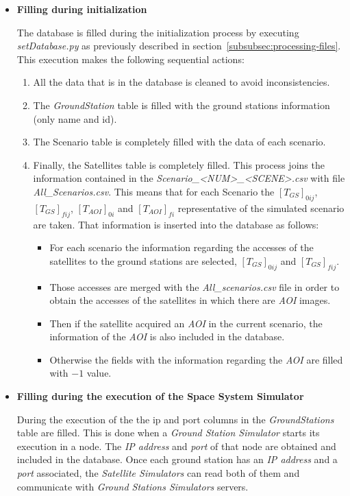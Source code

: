 \begin{itemize}

\item \textbf{Filling during initialization}

The database is filled during the initialization process by executing
\emph{setDatabase.py} as previously described in section~\ref{subsubsec:processing-files}. This execution makes the following sequential
actions:
\begin{enumerate}
\item All the data that is in the database is cleaned to avoid inconsistencies.
\item The \emph{GroundStation} table is filled with the ground stations information (only name and id).
\item The Scenario table is completely filled with the data of each scenario.
\item Finally, the Satellites table is completely filled. This process joins the
  information contained in the \emph{Scenario\_<NUM>\_<SCENE>.csv} with file
  \emph{All\_Scenarios.csv}. This means that for each Scenario the $[T_{GS}]_{0ij}$,
  $[T_{GS}]_{fij}$,  $[T_{AOI}]_{0i}$ and $[T_{AOI}]_{fi}$ representative of the simulated
  scenario are taken. That information is inserted into the database as follows:
\begin{itemize}
\item For each scenario the information regarding the accesses of the satellites to the ground stations are selected, $[T_{GS}]_{0ij}$ and $[T_{GS}]_{fij}$.
\item Those accesses are merged with the \emph{All\_scenarios.csv} file in order to obtain the accesses of the satellites in which there are \emph{AOI} images.
\item Then if the satellite acquired an \emph{AOI} in the current scenario, the information of the \emph{AOI} is also included in the database.
\item Otherwise the fields with the information regarding the \emph{AOI} are filled
  with $-1$ value.
\end{itemize}
\end{enumerate}

\item \textbf{Filling during the execution of the Space System Simulator}

During the execution of the \gsss the ip and port columns in the
\emph{GroundStations} table are filled. This is done when a \emph{Ground Station
  Simulator} starts its execution in a node. The \emph{IP address} and
\emph{port} of that node are obtained and included in the database. Once each
ground station has an \emph{IP address} and a \emph{port} associated, the \emph{Satellite Simulators} can read both of them and communicate with \emph{Ground Stations Simulators} servers.

\end{itemize}


